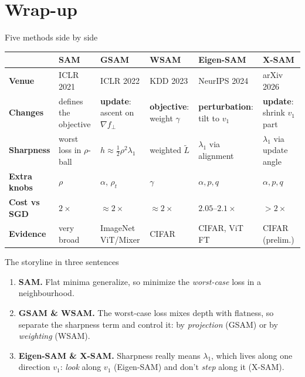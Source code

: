 \documentclass[aspectratio=169,10pt]{beamer}
\newcommand{\sectioninfo}{}
\newcommand{\sectionidea}{}
\newcommand{\partsection}[3]{%
  \renewcommand{\sectioninfo}{#2}%
  \renewcommand{\sectionidea}{#3}%
  \section{#1}}
\begin{document}
\partsection{Wrap-up}{Five methods, one recipe}{What changed, and what is still open?}

\begin{frame}{Five methods side by side}
\centering\small
\renewcommand{\arraystretch}{1.3}
\begin{tabular}{@{}>{\bfseries}l>{\raggedright}p{2.0cm}>{\raggedright}p{2.1cm}>{\raggedright}p{2.0cm}>{\raggedright}p{2.1cm}>{\raggedright\arraybackslash}p{2.1cm}@{}}
\toprule
& SAM & GSAM & WSAM & Eigen-SAM & X-SAM\\
\midrule
Venue & ICLR 2021 & ICLR 2022 & KDD 2023 & NeurIPS 2024 & arXiv 2026\\
Changes & defines the objective & \textbf{update}: ascent on $\nabla f_\perp$ & \textbf{objective}: weight $\gamma$ & \textbf{perturbation}: tilt to $v_1$ & \textbf{update}: shrink $v_1$ part\\
Sharpness & worst loss in $\rho$-ball & $h\approx\tfrac12\rho^2\lambda_1$ & weighted $\tilde L$ & $\lambda_1$ via alignment & $\lambda_1$ via update angle\\
Extra knobs & $\rho$ & $\alpha$, $\rho_t$ & $\gamma$ & $\alpha,p,q$ & $\alpha,p,q$\\
Cost vs SGD & $2\times$ & $\approx2\times$ & $\approx2\times$ & $2.05$--$2.1\times$ & $>2\times$\\
Evidence & very broad & ImageNet ViT/Mixer & CIFAR & CIFAR, ViT FT & CIFAR (prelim.)\\
\bottomrule
\end{tabular}
\end{frame}

\begin{frame}{The storyline in three sentences}
\begin{enumerate}\setlength{\itemsep}{1.4em}
  \item[\textbf{1.}] \textbf{SAM.} Flat minima generalize, so minimize the \emph{worst-case} loss in a neighbourhood.
  \item[\textbf{2.}] \textbf{GSAM \& WSAM.} The worst-case loss mixes depth with flatness, so separate the sharpness term and control it: by \emph{projection} (GSAM) or by \emph{weighting} (WSAM).
  \item[\textbf{3.}] \textbf{Eigen-SAM \& X-SAM.} Sharpness really means $\lambda_1$, which lives along one direction $v_1$: \emph{look} along $v_1$ (Eigen-SAM) and don't \emph{step} along it (X-SAM).
\end{enumerate}
\end{frame}
\end{document}
